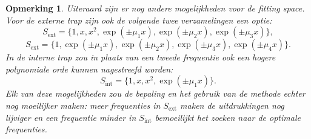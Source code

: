 \documentclass[12pt]{article}
\newtheorem{opm}[defn]{Opmerking}
\begin{document}
\begin{opm}
Uiteraard zijn er nog andere mogelijkheden voor de fitting space. Voor de externe trap zijn ook de volgende twee verzamelingen een optie:
\[S_{\textrm{ext}}=\{1,x,x^2,\exp(\pm\mu_1x),\exp(\pm\mu_2x),\exp(\pm\mu_3x)\},\]
\[S_{\textrm{ext}}=\{1,\exp(\pm\mu_1x),\exp(\pm\mu_2x),\exp(\pm\mu_3x),\exp(\pm\mu_4x)\}.\]
In de interne trap zou in plaats van een tweede frequentie ook een hogere polynomiale orde kunnen nagestreefd worden:
\[S_{\textrm{int}}=\{1,x,x^2,\exp(\pm\mu_1x)\}.\]
Elk van deze mogelijkheden zou de bepaling en het gebruik van de methode echter nog moeilijker maken: meer frequenties in \(S_{\textrm{ext}}\) maken de uitdrukkingen nog lijviger en een frequentie minder in \(S_{\textrm{int}}\) bemoeilijkt het zoeken naar de optimale frequenties.  
\end{opm}
\end{document}
